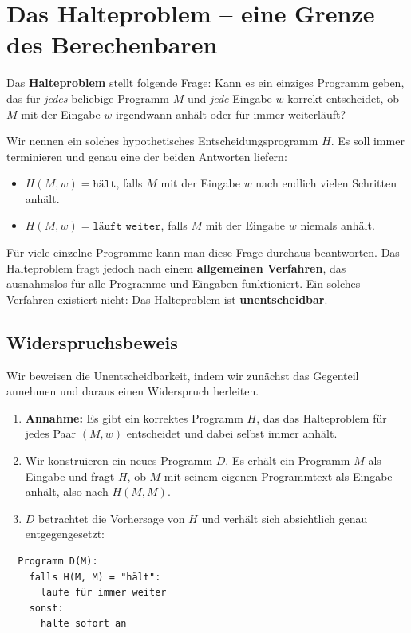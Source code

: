 \documentclass{article}
\begin{document}
\section{Das Halteproblem -- eine Grenze des Berechenbaren}

Das \textbf{Halteproblem} stellt folgende Frage: Kann es ein einziges Programm geben, das für \emph{jedes} beliebige Programm $M$ und \emph{jede} Eingabe $w$ korrekt entscheidet, ob $M$ mit der Eingabe $w$ irgendwann anhält oder für immer weiterläuft?

Wir nennen ein solches hypothetisches Entscheidungsprogramm $H$. Es soll immer terminieren und genau eine der beiden Antworten liefern:

\begin{itemize}
  \item $H(M,w)=\texttt{hält}$, falls $M$ mit der Eingabe $w$ nach endlich vielen Schritten anhält.
  \item $H(M,w)=\texttt{läuft weiter}$, falls $M$ mit der Eingabe $w$ niemals anhält.
\end{itemize}

Für viele einzelne Programme kann man diese Frage durchaus beantworten. Das Halteproblem fragt jedoch nach einem \textbf{allgemeinen Verfahren}, das ausnahmslos für alle Programme und Eingaben funktioniert. Ein solches Verfahren existiert nicht: Das Halteproblem ist \textbf{unentscheidbar}.

\subsection{Widerspruchsbeweis}

Wir beweisen die Unentscheidbarkeit, indem wir zunächst das Gegenteil annehmen und daraus einen Widerspruch herleiten.

\begin{enumerate}
  \item \textbf{Annahme:} Es gibt ein korrektes Programm $H$, das das Halteproblem für jedes Paar $(M,w)$ entscheidet und dabei selbst immer anhält.
  \item Wir konstruieren ein neues Programm $D$. Es erhält ein Programm $M$ als Eingabe und fragt $H$, ob $M$ mit seinem eigenen Programmtext als Eingabe anhält, also nach $H(M,M)$.
  \item $D$ betrachtet die Vorhersage von $H$ und verhält sich absichtlich genau entgegengesetzt:
\end{enumerate}

\begin{verbatim}
  Programm D(M):
    falls H(M, M) = "hält":
      laufe für immer weiter
    sonst:
      halte sofort an
\end{verbatim}
\end{document}
